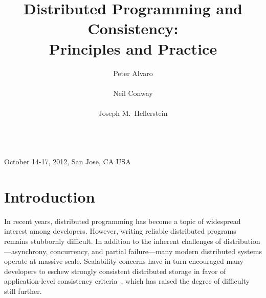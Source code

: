 \usepackage{color}
\usepackage{graphicx}
\usepackage{url}
\usepackage{xspace}
\usepackage[T1]{fontenc}
\usepackage{times}
\usepackage{txfonts}  %
\usepackage{textcomp}
\usepackage[protrusion=true,expansion=true]{microtype}
\usepackage{paralist}
\usepackage{comment}
\usepackage[hidelinks]{hyperref}

\def\blooml{Bloom$^L$\xspace}

\frenchspacing



 {October 14-17, 2012, San Jose, CA USA} 

\title{Distributed Programming and Consistency:\\Principles and Practice}

\author{
\alignauthor
Peter Alvaro\\
        \\
\alignauthor
Neil Conway\\
        \\
\alignauthor
Joseph M.\ Hellerstein\\
        \\
}

\maketitle

\section{Introduction}

In recent years, distributed programming has become a topic of widespread
interest among developers. However, writing reliable distributed programs
remains stubbornly difficult. In addition to the inherent challenges of
distribution---asynchrony, concurrency, and partial failure---many modern
distributed systems operate at massive scale. Scalability concerns have in turn
encouraged many developers to eschew strongly consistent distributed storage in
favor of application-level consistency criteria~\cite{Birman2009,Helland2009,vogels},
which has raised the degree of difficulty still further.

